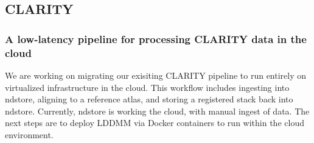 \documentclass[simplex.tex]{subfiles}
\begin{document}
\subsection{CLARITY}

\subsubsection{A low-latency pipeline for processing CLARITY data in the cloud}

We are working on migrating our exisiting CLARITY pipeline to run entirely on virtualized infrastructure in the cloud.
This workflow includes ingesting into ndstore, aligning to a reference atlas, and storing a registered stack back into ndstore.
Currently, ndstore is working the cloud, with manual ingest of data.
The next steps are to deploy LDDMM via Docker containers to run within the cloud environment.
\end{document}
